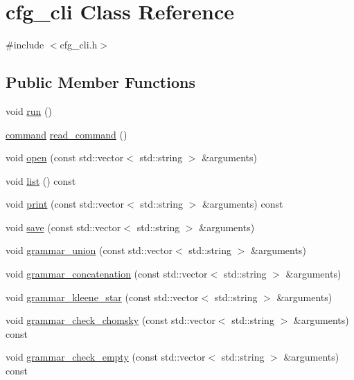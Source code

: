 \hypertarget{classcfg__cli}{}\section{cfg\+\_\+cli Class Reference}
\label{classcfg__cli}


{\ttfamily \#include $<$cfg\+\_\+cli.\+h$>$}

\subsection*{Public Member Functions}
\begin{DoxyCompactItemize}
\item 
void \mbox{\hyperlink{classcfg__cli_a4698335f2fd01d4abb19651cde3ce898}{run}} ()
\item 
\mbox{\hyperlink{structcommand}{command}} \mbox{\hyperlink{classcfg__cli_ad4be9b5541afca7e8604ede8d66b0859}{read\+\_\+command}} ()
\item 
void \mbox{\hyperlink{classcfg__cli_a7cab592cbf2c62defe32013be876ae67}{open}} (const std\+::vector$<$ std\+::string $>$ \&arguments)
\item 
void \mbox{\hyperlink{classcfg__cli_afd8799d78f8f03d2ad6be723c8bcf2c5}{list}} () const
\item 
void \mbox{\hyperlink{classcfg__cli_add8ecd5384eb0f41173e1d13bc3a0db5}{print}} (const std\+::vector$<$ std\+::string $>$ \&arguments) const
\item 
void \mbox{\hyperlink{classcfg__cli_ab4206d3ef9d20e52d6592c44dc85979e}{save}} (const std\+::vector$<$ std\+::string $>$ \&arguments)
\item 
void \mbox{\hyperlink{classcfg__cli_ac6f35017786fa9f561e9278d3609e937}{grammar\+\_\+union}} (const std\+::vector$<$ std\+::string $>$ \&arguments)
\item 
void \mbox{\hyperlink{classcfg__cli_a351532c63ecdd76043c8f906d297c0bf}{grammar\+\_\+concatenation}} (const std\+::vector$<$ std\+::string $>$ \&arguments)
\item 
void \mbox{\hyperlink{classcfg__cli_ae1adc6d5a037500ed69d62e6834f60f9}{grammar\+\_\+kleene\+\_\+star}} (const std\+::vector$<$ std\+::string $>$ \&arguments)
\item 
void \mbox{\hyperlink{classcfg__cli_a53b16d52eeb8cf55d0fd3e46e948b2ea}{grammar\+\_\+check\+\_\+chomsky}} (const std\+::vector$<$ std\+::string $>$ \&arguments) const
\item 
void \mbox{\hyperlink{classcfg__cli_ac8c3f52a81dc07bf8f9fe231e1e116f7}{grammar\+\_\+check\+\_\+empty}} (const std\+::vector$<$ std\+::string $>$ \&arguments) const

\end{DoxyCompactItemize}
